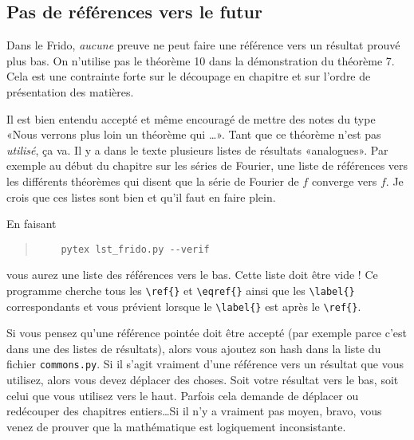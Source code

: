 \documentclass[a4paper,12pt]{article}
\newcommand{\info}[1]{\texttt{#1}}
\begin{document}
\subsection{Pas de références vers le futur}

Dans le Frido, \emph{aucune} preuve ne peut faire une référence vers un résultat prouvé plus bas. On n'utilise pas le théorème 10 dans la démonstration du théorème 7. Cela est une contrainte forte sur le découpage en chapitre et sur l'ordre de présentation des matières.

Il est bien entendu accepté et même encouragé de mettre des notes du type «Nous verrons plus loin un théorème qui \ldots». Tant que ce théorème n'est pas \emph{utilisé}, ça va. Il y a dans le texte plusieurs listes de résultats «analogues». Par exemple au début du chapitre sur les séries de Fourier, une liste de références vers les différents théorèmes qui disent que la série de Fourier de \( f\) converge vers \( f\).  Je crois que ces listes sont bien et qu'il faut en faire plein.

En faisant
\begin{quote}
    \begin{verbatim}
    pytex lst_frido.py --verif
    \end{verbatim}
\end{quote}
vous aurez une liste des références vers le bas. Cette liste doit être vide ! Ce programme cherche tous les \verb+\ref{}+ et \verb+\eqref{}+ ainsi que les \verb+\label{}+ correspondants et vous prévient lorsque le \verb+\label{}+ est après le \verb+\ref{}+.

Si vous pensez qu'une référence pointée doit être accepté (par exemple parce c'est dans une des listes de résultats), alors vous ajoutez son hash dans la liste du fichier \info{commons.py}. Si il s'agit vraiment d'une référence vers un résultat que vous utilisez, alors vous devez déplacer des choses. Soit votre résultat vers le bas, soit celui que vous utilisez vers le haut. Parfois cela demande de déplacer ou redécouper des chapitres entiers\ldots Si il n'y a vraiment pas moyen, bravo, vous venez de prouver que la mathématique est logiquement inconsistante.
\end{document}
